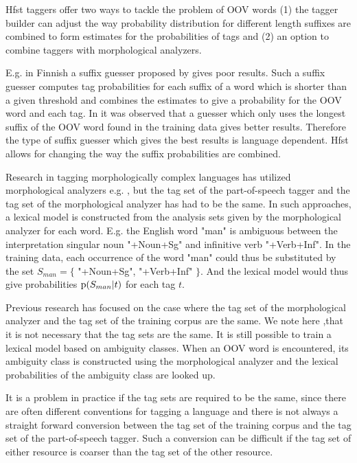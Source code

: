 \documentclass{llncs}
\begin{document}
Hfst taggers offer two ways to tackle the problem of OOV words (1) the
 tagger builder can adjust the way probability distribution for
 different length suffixes are combined to form estimates for the
 probabilities of tags and (2) an option to combine taggers with
 morphological analyzers.

E.g. in Finnish a suffix guesser proposed by \cite{Brants:2000} gives
 poor results. Such a suffix guesser computes tag probabilities for
 each suffix of a word which is shorter than a given threshold and
 combines the estimates to give a probability for the OOV word and
 each tag. In \cite{Silfverberg/2011} it was observed that a guesser
 which only uses the longest suffix of the OOV word found in the
 training data gives better results. Therefore the type of suffix
 guesser which gives the best results is language dependent. Hfst
 allows for changing the way the suffix probabilities are combined.

Research in tagging morphologically complex languages has utilized
 morphological analyzers e.g. \cite{Tzoukerman:1996,Oravecz:2002}, but
 the tag set of the part-of-speech tagger and the tag set of the
 morphological analyzer has had to be the same. In such approaches, a
 lexical model is constructed from the analysis sets given by the
 morphological analyzer for each word. E.g. the English word "man" is
 ambiguous between the interpretation singular noun "+Noun+Sg" and
 infinitive verb "+Verb+Inf". In the training data, each occurrence of
 the word "man" could thus be substituted by the set $S_{man} = \{$
 "+Noun+Sg", "+Verb+Inf" $\}$. And the lexical model would thus give
 probabilities ${\rm p}(S_{man}|t)$ for each tag $t$. 

Previous research has focused on the case where the tag set of the
 morphological analyzer and the tag set of the training corpus are the
 same. We note here ,that it is not necessary that the tag sets are
 the same. It is still possible to train a lexical model based on
 ambiguity classes. When an OOV word is encountered, its ambiguity
 class is constructed using the morphological analyzer and the lexical
 probabilities of the ambiguity class are looked up.

It is a problem in practice if the tag sets are required to be the
 same, since there are often different conventions for tagging a
 language and there is not always a straight forward conversion
 between the tag set of the training corpus and the tag set of the
 part-of-speech tagger. Such a conversion can be difficult if the tag
 set of either resource is coarser than the tag set of the other
 resource.
\end{document}
